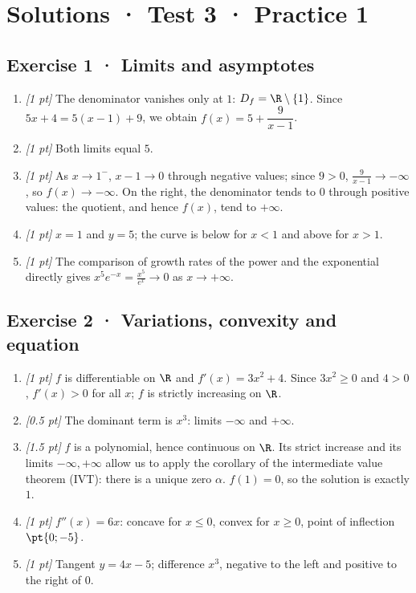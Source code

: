\ifmxteacher\mxnewpage

\section*{Solutions · Test 3 · Practice 1}\label{cor:4-1}

\subsection*{Exercise 1 · Limits and asymptotes}\begin{enumerate}

\item \textit{[1 pt]} The denominator vanishes only at $1$: $D_f=\R\setminus\{1\}$. Since $5x+4=5(x-1)+9$, we obtain $f(x)=5+\dfrac{9}{x-1}$.

\item \textit{[1 pt]} Both limits equal $5$.

\item \textit{[1 pt]} As $x\to 1^-$, $x-1\to0$ through negative values; since $9>0$, $\frac{9}{x-1}\to-\infty$, so $f(x)\to-\infty$. On the right, the denominator tends to $0$ through positive values: the quotient, and hence $f(x)$, tend to $+\infty$.

\item \textit{[1 pt]} $x=1$ and $y=5$; the curve is below for $x<1$ and above for $x>1$.

\item \textit{[1 pt]} The comparison of growth rates of the power and the exponential directly gives $x^5e^{-x}=\frac{x^5}{e^x}\to0$ as $x\to+\infty$.

\end{enumerate}

\subsection*{Exercise 2 · Variations, convexity and equation}\begin{enumerate}

\item \textit{[1 pt]} $f$ is differentiable on $\R$ and $f'(x)=3x^2+4$. Since $3x^2\ge0$ and $4>0$, $f'(x)>0$ for all $x$; $f$ is strictly increasing on $\R$.

\item \textit{[0.5 pt]} The dominant term is $x^3$: limits $-\infty$ and $+\infty$.

\item \textit{[1.5 pt]} $f$ is a polynomial, hence continuous on $\R$. Its strict increase and its limits $-\infty,+\infty$ allow us to apply the corollary of the intermediate value theorem (IVT): there is a unique zero $\alpha$. $f(1)=0$, so the solution is exactly $1$.

\item \textit{[1 pt]} $f''(x)=6x$: concave for $x\le0$, convex for $x\ge0$, point of inflection $\pt{0;-5}$.

\item \textit{[1 pt]} Tangent $y=4x-5$; difference $x^3$, negative to the left and positive to the right of $0$.

\end{enumerate}

